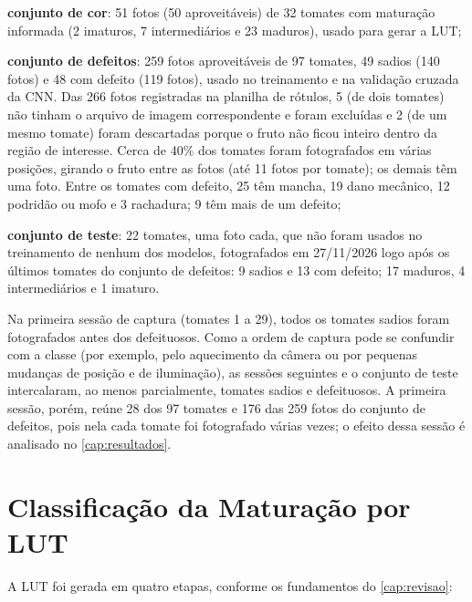 \begin{alineas}
	\item \textbf{conjunto de cor}: 51 fotos (50 aproveitáveis) de 32 tomates com maturação informada (2 imaturos, 7 intermediários e 23 maduros), usado para gerar a LUT;
	\item \textbf{conjunto de defeitos}: 259 fotos aproveitáveis de 97 tomates, 49 sadios (140 fotos) e 48 com defeito (119 fotos), usado no treinamento e na validação cruzada da CNN. Das 266 fotos registradas na planilha de rótulos, 5 (de dois tomates) não tinham o arquivo de imagem correspondente e foram excluídas e 2 (de um mesmo tomate) foram descartadas porque o fruto não ficou inteiro dentro da região de interesse. Cerca de 40\% dos tomates foram fotografados em várias posições, girando o fruto entre as fotos (até 11 fotos por tomate); os demais têm uma foto. Entre os tomates com defeito, 25 têm mancha, 19 dano mecânico, 12 podridão ou mofo e 3 rachadura; 9 têm mais de um defeito;
	\item \textbf{conjunto de teste}: 22 tomates, uma foto cada, que não foram usados no treinamento de nenhum dos modelos, fotografados em 27/11/2026 logo após os últimos tomates do conjunto de defeitos: 9 sadios e 13 com defeito; 17 maduros, 4 intermediários e 1 imaturo.
\end{alineas}

Na primeira sessão de captura (tomates 1 a 29), todos os tomates sadios foram fotografados antes dos defeituosos. Como a ordem de captura pode se confundir com a classe (por exemplo, pelo aquecimento da câmera ou por pequenas mudanças de posição e de iluminação), as sessões seguintes e o conjunto de teste intercalaram, ao menos parcialmente, tomates sadios e defeituosos. A primeira sessão, porém, reúne 28 dos 97 tomates e 176 das 259 fotos do conjunto de defeitos, pois nela cada tomate foi fotografado várias vezes; o efeito dessa sessão é analisado no \autoref{cap:resultados}.

\section{Classificação da Maturação por LUT}

A LUT foi gerada em quatro etapas, conforme os fundamentos do \autoref{cap:revisao}:

